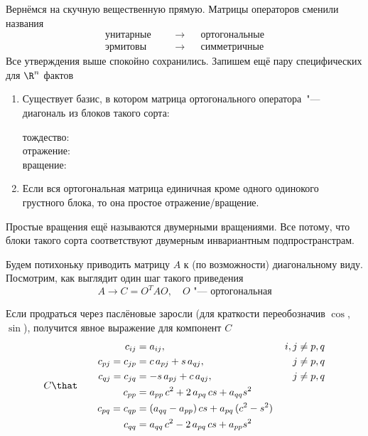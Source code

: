 \documentclass{trlnotes}
\begin{document}
Вернёмся на скучную вещественную прямую.
Матрицы операторов сменили названия
\[
  \begin{aligned}
    \text{унитарные}& &&\to& &\text{ортогональные} \\
    \text{эрмитовы}& &&\to& &\text{симметричные}
  \end{aligned}
\]
Все утверждения выше спокойно сохранились.
Запишем ещё пару специфических для $\R^n$ фактов 
\begin{enumerate}[resume]
  \item Существует базис, в котором матрица ортогонального оператора~"--- диагональ из
    блоков такого сорта:
    \begin{description}
      \item[тождество:]  
      \item[отражение:]  
      \item[вращение:] 
    \end{description}
  \item Если вся ортогональная матрица единичная кроме одного одинокого грустного блока, то
    она простое отражение/вращение.
\end{enumerate}

Простые вращения ещё называются двумерными вращениями.
Все потому, что блоки такого сорта соответствуют двумерным инвариантным подпространстрам.

Будем потихоньку приводить матрицу $A$ к (по возможности) диагональному виду.
Посмотрим, как выглядит один шаг такого приведения
\[
  A \to C = O^T A O, \quad \text{$O$~"--- ортогональная}
\]

Если продраться через паслёновые заросли (для краткости переобозначив $\cos$, $\sin$), получится
явное выражение для компонент $C$
\begin{equation}\label{eq:lin::rot::step}
  C \that \qquad  
    \begin{aligned}
               c_{ij} &= a_{ij}, & i,j &\neq p,q \\
      c_{pj} = c_{jp} &= c\,a_{pj} + s \,a_{qj}, &\quad j &\neq p,q \\
      c_{qj} = c_{jq} &= -s\,a_{pj} + c \,a_{qj}, &\quad j &\neq p,q \\
               c_{pp} &= a_{pp}\, c^2 + 2\,a_{pq}\, cs + a_{qq}s^2 \\
      c_{pq} = c_{qp} &= (a_{qq} - a_{pp})\,cs + a_{pq}\,(c^2 - s^2) \\
               c_{qq} &= a_{qq}\, c^2 - 2\,a_{pq}\, cs + a_{pp}s^2 \\
  \end{aligned}
\end{equation}
\end{document}
